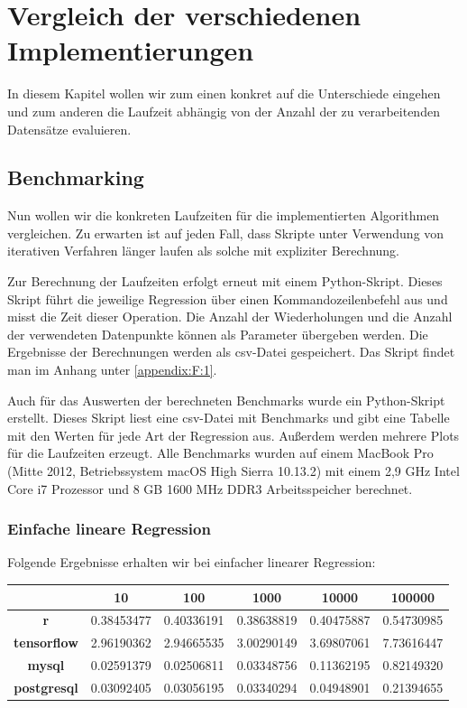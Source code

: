 \chapter{Vergleich der verschiedenen Implementierungen}
\label{chapter:4}

In diesem Kapitel wollen wir zum einen konkret auf die Unterschiede eingehen und zum anderen die Laufzeit abhängig von der Anzahl der zu verarbeitenden Datensätze evaluieren.

\section{Benchmarking}
\label{section:4:1}

Nun wollen wir die konkreten Laufzeiten für die implementierten Algorithmen vergleichen. Zu erwarten ist auf jeden Fall, dass Skripte unter Verwendung von iterativen Verfahren länger laufen als solche mit expliziter Berechnung.

Zur Berechnung der Laufzeiten erfolgt erneut mit einem Python-Skript. Dieses Skript führt die jeweilige Regression über einen Kommandozeilenbefehl aus und misst die Zeit dieser Operation. Die Anzahl der Wiederholungen und die Anzahl der verwendeten Datenpunkte können als Parameter übergeben werden. Die Ergebnisse der Berechnungen werden als csv-Datei gespeichert. Das Skript findet man im Anhang unter \ref{appendix:F:1}.

Auch für das Auswerten der berechneten Benchmarks wurde ein Python-Skript erstellt. Dieses Skript liest eine csv-Datei mit Benchmarks und gibt eine Tabelle mit den Werten für jede Art der Regression aus. Außerdem werden mehrere Plots für die Laufzeiten erzeugt. Alle Benchmarks wurden auf einem MacBook Pro (Mitte 2012, Betriebssystem macOS High Sierra 10.13.2) mit einem 2,9 GHz Intel Core i7 Prozessor und 8 GB 1600 MHz DDR3 Arbeitsspeicher berechnet.

\subsection{Einfache lineare Regression}
\label{subsection:4:1:1}

Folgende Ergebnisse erhalten wir bei einfacher linearer Regression:

\begin{center}
  \begin{tabular}{|c|c|c|c|c|c|}\hline
    & \textbf{10} & \textbf{100} & \textbf{1000} & \textbf{10000} & \textbf{100000} \\ \hline
    \textbf{r} & 0.38453477 & 0.40336191 & 0.38638819 & 0.40475887 & 0.54730985 \\ \hline
    \textbf{tensorflow} & 2.96190362 & 2.94665535 & 3.00290149 & 3.69807061 & 7.73616447 \\ \hline
    \textbf{mysql} & 0.02591379 & 0.02506811 & 0.03348756 & 0.11362195 & 0.82149320 \\ \hline
    \textbf{postgresql} & 0.03092405 & 0.03056195 & 0.03340294 & 0.04948901 & 0.21394655 \\ \hline
  \end{tabular}
\end{center}


